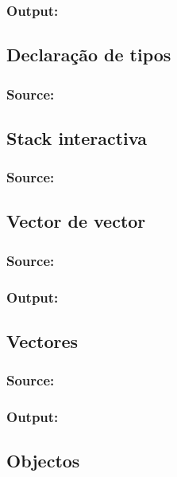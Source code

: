 {\subsubsection*{Output:}


\subsection*{Declaração de tipos}
\subsubsection*{Source:}


\subsection*{Stack interactiva}
\subsubsection*{Source:}


\subsection*{Vector de vector}
\subsubsection*{Source:}

\subsubsection*{Output:}


\newpage
\subsection*{Vectores}
\subsubsection*{Source:}

\subsubsection*{Output:}


\newpage
\subsection*{Objectos}
}
